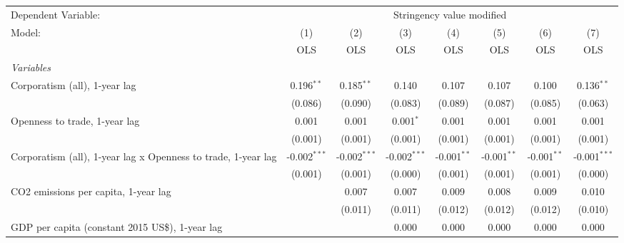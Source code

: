
\begingroup
\centering
\begin{tabular}{lccccccc}
   \toprule
   Dependent Variable: & \multicolumn{7}{c}{Stringency value modified}\\
   Model:                                                        & (1)            & (2)            & (3)            & (4)           & (5)           & (6)           & (7)\\  
                                                                 &  OLS           & OLS            & OLS            & OLS           & OLS           & OLS           & OLS\\  
   \midrule
   \emph{Variables}\\
   Corporatism (all), 1-year lag                                 & 0.196$^{**}$   & 0.185$^{**}$   & 0.140          & 0.107         & 0.107         & 0.100         & 0.136$^{**}$\\   
                                                                 & (0.086)        & (0.090)        & (0.083)        & (0.089)       & (0.087)       & (0.085)       & (0.063)\\   
   Openness to trade, 1-year lag                                 & 0.001          & 0.001          & 0.001$^{*}$    & 0.001         & 0.001         & 0.001         & 0.001\\   
                                                                 & (0.001)        & (0.001)        & (0.001)        & (0.001)       & (0.001)       & (0.001)       & (0.001)\\   
   Corporatism (all), 1-year lag x Openness to trade, 1-year lag & -0.002$^{***}$ & -0.002$^{***}$ & -0.002$^{***}$ & -0.001$^{**}$ & -0.001$^{**}$ & -0.001$^{**}$ & -0.001$^{***}$\\   
                                                                 & (0.001)        & (0.001)        & (0.000)        & (0.001)       & (0.001)       & (0.001)       & (0.000)\\   
   CO2 emissions per capita, 1-year lag                          &                & 0.007          & 0.007          & 0.009         & 0.008         & 0.009         & 0.010\\   
                                                                 &                & (0.011)        & (0.011)        & (0.012)       & (0.012)       & (0.012)       & (0.010)\\   
   GDP per capita (constant 2015 US\$), 1-year lag               &                &                & 0.000          & 0.000         & 0.000         & 0.000         & 0.000\\   

\end{tabular}
